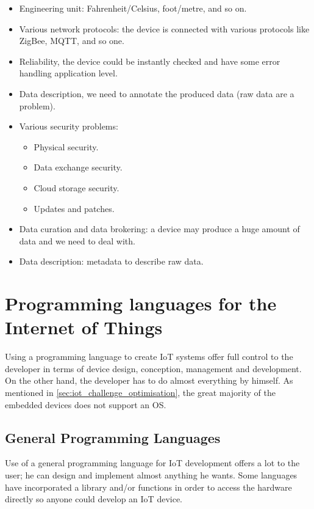 \begin{itemize}
\item Engineering unit: Fahrenheit/Celsius, foot/metre, and so on.
\item Various network protocols: the device is connected with various protocols
like ZigBee, MQTT, and so one.
\item Reliability, the device could be instantly checked and have some error
handling application level.
\item Data description, we need to annotate the produced data (raw data are a
problem).
\item Various security problems:
  \begin{itemize}
  \item Physical security.
  \item Data exchange security.
  \item Cloud storage security.
  \item Updates and patches.
  \end{itemize}
\item Data curation and data brokering: a device may produce a huge amount of
data and we need to deal with.
\item Data description: metadata to describe raw data.
\end{itemize}

\section{Programming languages for the Internet of Things}
\label{sec:pl_for_iot}

Using a programming language to create \gls{IoT} systems offer full control to
the developer in terms of device design, conception, management and development.
On the other hand, the developer has to do almost everything by himself. As mentioned
in \ref{sec:iot_challenge_optimisation}, the great majority of the embedded
devices does not support an \gls{OS}.

\subsection{General Programming Languages}
\label{sec:gen_pl}

Use of a general programming language for \gls{IoT} development offers a lot to the
user; he can design and implement almost anything he wants. Some languages have
incorporated a library and/or functions in order to access the hardware directly so
anyone could develop an \gls{IoT} device.

